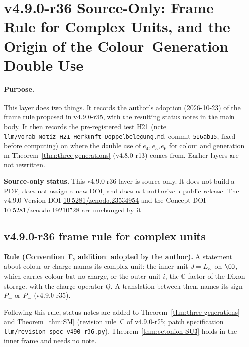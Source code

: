\clearpage
\section*{v4.9.0-r36 Source-Only: Frame Rule for Complex Units, and the Origin of the Colour--Generation Double Use}
\label{sec:v490-r36-unit-rule-double-use}

\paragraph{Purpose.}
This layer does two things.  It records the author's adoption (2026-10-23) of the frame rule proposed in v4.9.0-r35, with the
resulting status notes in the main body.  It then records the pre-registered test H21 (note
\texttt{llm/Vorab\_Notiz\_H21\_Herkunft\_Doppelbelegung.md}, commit \texttt{516ab15}, fixed before computing) on where the double use
of \(e_4,e_5,e_6\) for colour and generation in Theorem~\ref{thm:three-generations} (v4.8.0-r13) comes from.  Earlier layers are not
rewritten.

\noindent\textbf{Source-only status.}
This v4.9.0-r36 layer is source-only.  It does not build a PDF, does not assign a new DOI,
and does not authorize a public release.  The v4.9.0 Version DOI
\href{https://doi.org/10.5281/zenodo.23534954}{10.5281/zenodo.23534954} and the Concept DOI
\href{https://doi.org/10.5281/zenodo.19210728}{10.5281/zenodo.19210728} are unchanged by it.

\subsection*{v4.9.0-r36 frame rule for complex units}
\label{subsec:v490-r36-unit-rule}

\noindent\textbf{Rule (Convention~F, addition; adopted by the author).}
A statement about colour or charge names its complex unit: the inner unit \(J=L_{e_7}\) on \(\OO\), which carries colour but no
charge, or the outer unit \(i\), the \(\mathbb C\) factor of the Dixon storage, with the charge operator \(Q\).  A translation
between them names its sign \(P_+\) or \(P_-\) (v4.9.0-r35).

Following this rule, status notes are added to Theorem~\ref{thm:three-generations} and Theorem~\ref{thm:SM} (revision rule~C of
v4.9.0-r25; patch specification \texttt{llm/revision\_spec\_v490\_r36.py}).  Theorem~\ref{thm:octonion-SU3} holds in the inner
frame and needs no note.

